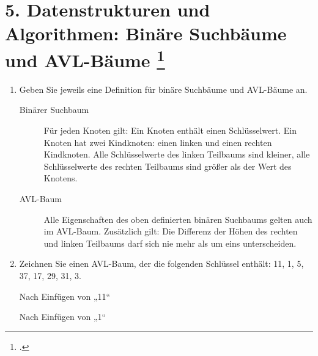 \documentclass{bschlangaul-aufgabe}
\begin{document}
\section{5. Datenstrukturen und Algorithmen: Binäre Suchbäume und AVL-Bäume
\footcite{examen:46115:2010:03}}

\begin{enumerate}
\item Geben Sie jeweils eine Definition für binäre Suchbäume und
AVL-Bäume an.

\begin{liAntwort}

\begin{description}
\item[Binärer Suchbaum] Für jeden Knoten gilt: Ein Knoten enthält einen
Schlüsselwert. Ein Knoten hat zwei Kindknoten: einen linken und einen
rechten Kindknoten. Alle Schlüsselwerte des linken Teilbaums sind
kleiner, alle Schlüsselwerte des rechten Teilbaums sind größer als der
Wert des Knotens.

\item[AVL-Baum] Alle Eigenschaften des oben definierten binären
Suchbaums gelten auch im AVL-Baum. Zusätzlich gilt: Die Differenz der
Höhen des rechten und linken Teilbaums darf sich nie mehr als um eins
unterscheiden.
\end{description}

\end{liAntwort}

\item Zeichnen Sie einen AVL-Baum, der die folgenden Schlüssel enthält:
11, 1, 5, 37, 17, 29, 31, 3.

\begin{liAntwort}
\begin{liDiagramm}{Nach Einfügen von „11“}
\end{liDiagramm}

\begin{liDiagramm}{Nach Einfügen von „1“}
\end{liDiagramm}


\end{liAntwort}
\end{enumerate}
\end{document}
